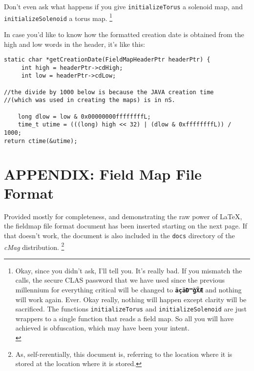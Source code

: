 \documentclass{article}
\begin{document}
Don't even ask what happens if you give \texttt{initializeTorus} a solenoid map, and \texttt{initializeSolenoid}  a torus map. \footnote{Okay, since you didn't ask, I'll tell you. It's really bad. If you mismatch the calls, the secure CLAS password that we have used since the previous millennium for everything critical will be changed to \textbf{\texttt{äçäĐ™ǧẌÆ}} and nothing will work again. Ever. Okay really, nothing will happen except clarity will be sacrificed. The functions \texttt{initializeTorus} and \texttt{initializeSolenoid} are just wrappers to a single function that reads a field map. So all you will have achieved is obfuscation, which may have been your intent.\\}

In case you'd like to know how the formatted creation date is obtained from the high and low words in the header, it's like this:
\begin{verbatim}
static char *getCreationDate(FieldMapHeaderPtr headerPtr) {
     int high = headerPtr->cdHigh;
     int low = headerPtr->cdLow;

//the divide by 1000 below is because the JAVA creation time 
//(which was used in creating the maps) is in nS.

    long dlow = low & 0x00000000ffffffffL;
    time_t utime = (((long) high << 32) | (dlow & 0xffffffffL)) / 1000;
return ctime(&utime);
\end{verbatim}

\newpage
\section{APPENDIX: Field Map File Format}
Provided mostly for completeness, and demonstrating the raw power of \LaTeX, the fieldmap file format document has been inserted starting on the next page. If that doesn't work, the document is also included in the  \texttt{docs} directory of the \textit{cMag} distribution. \footnote{ As, self-rerentially, this document is, referring to the location where it is stored at the location where it is stored.}

\end{document}
